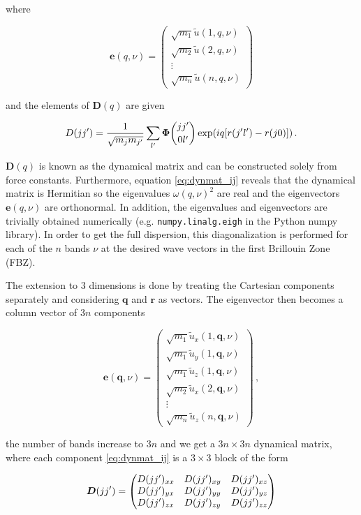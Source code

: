 \noindent where 

\[ \bm{e}(q,\nu) = \begin{pmatrix}
\sqrt{m_1}\tilde{u}(1,q,\nu) \\
\sqrt{m_2}\tilde{u}(2,q,\nu) \\
\vdots \\
\sqrt{m_n}\tilde{u}(n,q,\nu)
\end{pmatrix} \]

\noindent and the elements of $\bm{D}(q)$ are given 

\begin{equation}
D(j\jp) = \frac{1}{\sqrt{m_j m_{\jp}}} \sum_{\lp} \fczero \exp (iq[r(\jp\lp) - r(j0)]) \, . \label{eq:dynmat_ij}
\end{equation}

\noindent $\bm{D}(q)$ is known as the dynamical matrix and can be constructed solely from force constants. Furthermore, equation \eqref{eq:dynmat_ij} reveals that the dynamical matrix is Hermitian so the eigenvalues $\omega(q,\nu)^2$ are real and the eigenvectors $\bm{e}(q, \nu)$ are orthonormal. In addition, the eigenvalues and eigenvectors are trivially obtained numerically (e.g. \texttt{numpy.linalg.eigh} in the Python numpy library). In order to get the full dispersion, this diagonalization is performed for each of the $n$ bands $\nu$ at the desired wave vectors in the first Brillouin Zone (FBZ). 

The extension to 3 dimensions is done by treating the Cartesian components separately and considering $\bm{q}$ and $\bm{r}$ as vectors. The eigenvector then becomes a column vector of $3n$ components 

\[ \bm{e}(\bm{q},\nu) = \begin{pmatrix}
\sqrt{m_1}\tilde{u}_x(1,\bm{q},\nu) \\
\sqrt{m_1}\tilde{u}_y(1,\bm{q},\nu) \\
\sqrt{m_1}\tilde{u}_z(1,\bm{q},\nu) \\
\sqrt{m_2}\tilde{u}_x(2,\bm{q},\nu) \\
\vdots \\
\sqrt{m_{n}}\tilde{u}_z(n,\bm{q},\nu)
\end{pmatrix} \, , \]

\noindent the number of bands increase to $3n$ and we get a $3n \times 3n$ dynamical matrix, where each component \eqref{eq:dynmat_ij} is a $3 \times 3$ block of the form

\[
\bm{D}(jj^\prime) = \begin{pmatrix}
D(jj^\prime)_{xx} & D(jj^\prime)_{xy} & D(jj^\prime)_{xz} \\
D(jj^\prime)_{yx} & D(jj^\prime)_{yy} & D(jj^\prime)_{yz} \\
D(jj^\prime)_{zx} & D(jj^\prime)_{zy} & D(jj^\prime)_{zz}
\end{pmatrix}
\]

